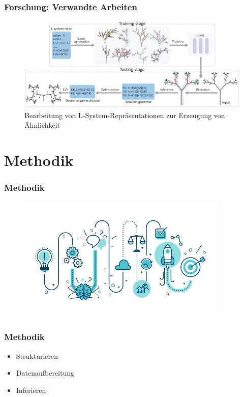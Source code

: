 \documentclass[12pt]{beamer}
\begin{document}
    \begin{frame}
        \frametitle{Forschung: Verwandte Arbeiten}

        \begin{figure}
            \centering
            \includegraphics[width=12cm]{../images/guo_2020_system.PNG}
            \caption{Bearbeitung von L-System-Repräsentationen zur Erzeugung von Ähnlichkeit}
        \end{figure}
    \end{frame}

    \section{Methodik}
    \label{sec:methodik}
    \begin{frame}
        \frametitle{Methodik}

        \begin{figure}
            \centering
            \includegraphics[width=10cm]{../images/methodik.jpg}
        \end{figure}
    \end{frame}

    \begin{frame}
        \frametitle{Methodik}

        \begin{itemize}
            \setlength\itemsep{1em}
            \item<1-> Strukturieren
            \item<2-> Datenaufbereitung
            \item<3-> Inferieren
        \end{itemize}
    \end{frame}
\end{document}
